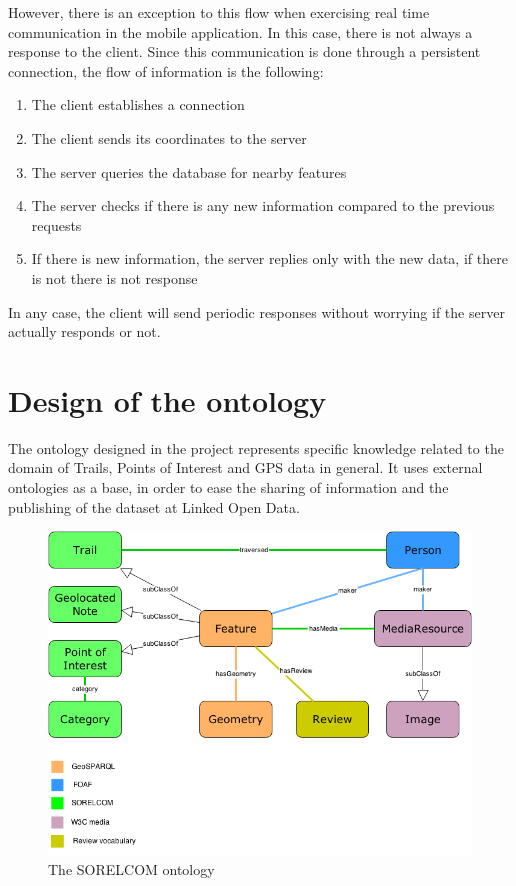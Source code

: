 However, there is an exception to this flow when exercising real time communication in the mobile application. In this case, there is not always a response to the client. Since this communication is done through a persistent connection, the flow of information is the following:

\begin{enumerate}
\item The client establishes a connection
\item The client sends its coordinates to the server
\item The server queries the database for nearby features
\item The server checks if there is any new information compared to the previous requests
\item If there is new information, the server replies only with the new data, if there is not there is not response
\end{enumerate}

In any case, the client will send periodic responses without worrying if the server actually responds or not.

\FloatBarrier
\section{Design of the ontology}\label{sec:ontdesign}

The ontology designed in the project represents specific knowledge related to the domain of Trails, Points of Interest and GPS data in general. It uses external ontologies as a base, in order to ease the sharing of information and the publishing of the dataset at Linked Open Data.

\begin{figure}[ht]
  \centering
  \includegraphics[width=.8\textwidth]{fig/sorelcom-ontology}
  \caption{The SORELCOM ontology}
  \label{fig:sorelcom-ontology}
\end{figure} 

